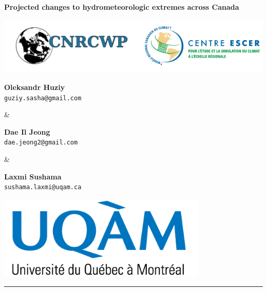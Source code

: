 \documentclass[a0,landscape]{a0poster}
\begin{document}


\noindent\begin{minipage}[b]{\linewidth}
\centering
\noindent \veryHuge \color{NavyBlue} \textbf{Projected changes to hydrometeorologic extremes across Canada} \color{Black}\\ %
\noindent\begin{minipage}[c]{0.2\linewidth}
      \center
      \includegraphics[width=25cm]{logo_cnrcwp_escer.png} %
\end{minipage} \hfill
%
\begin{minipage}[c]{0.15\linewidth}
  \center
  \Large \textbf{Oleksandr Huziy} \\
  \large \texttt{guziy.sasha@gmail.com}
\end{minipage}
%
\begin{minipage}[b]{0.01\linewidth}
 \center
 \Large\&
\end{minipage}
%
\begin{minipage}[c]{0.15\linewidth}
   \center
   \Large \textbf{Dae Il Jeong} \\
   \large  \texttt{dae.jeong2@gmail.com}
\end{minipage}\hfill
%
\begin{minipage}[b]{0.01\linewidth}
 \center
 \Large\&
\end{minipage}
%
\begin{minipage}[c]{0.15\linewidth}
   \center
   \Large \textbf{Laxmi Sushama} \\
   \large  \texttt{sushama.laxmi@uqam.ca}
\end{minipage}\hfill
%
\begin{minipage}[c]{0.2\linewidth}
  \center
  \includegraphics[width=10cm]{logo_uqam.png} %
\end{minipage}
\rule{\linewidth}{3pt}
\end{minipage}
%
\end{document}
